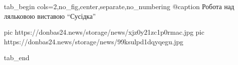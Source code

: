  
 
 
 
 

\ifcmt
  tab_begin cols=2,no_fig,center,separate,no_numbering
		@caption Робота над ляльковою виставою \enquote{Сусідка}

     pic https://donbas24.news/storage/news/xjz0y21zc1p0rmac.jpg
		 pic https://donbas24.news/storage/news/99ksulpd1dqyqegu.jpg

  tab_end
\fi
